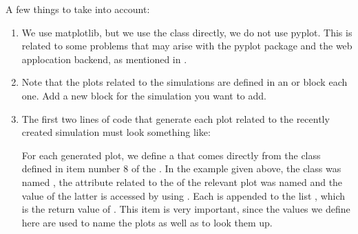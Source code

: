 \documentclass[a4paper,landscape,10pt,english]{sphinxmanual}
\begin{document}
A few things to take into account:
\begin{enumerate}
%
\item {} 
We use matplotlib, but we use the class  directly, we do not use
pyplot. This is related to some problems that may arise with the pyplot
package and the web applocation backend, as mentioned in
.

\item {} 
Note that the plots related to the simulations are defined in an  or
 block each one. Add a new block for the simulation you want to add.

\item {} 
The first two lines of code that generate each plot related to the recently
created simulation must look something like:

\begin{sphinxVerbatim}[commandchars=\\\{\}]
  
\end{sphinxVerbatim}

For each generated plot, we define a  that comes directly
from the class defined in item number 8 of the
{\hyperref[\detokenize{code_docs/new_simulation:new-simulation-schemas}]{}}. In the example given above,
the class was named , the attribute related to the
 of the relevant plot was named  and the value
of the latter is accessed by using .
Each  is appended to the list ,
which is the return value of {\hyperref[\detokenize{code_docs/simulation_api.controller:simulation_api.controller.tasks._plot_solution}]{}}.
This item is very important, since the values we define here are used to name
the plots as well as to look them up.


\end{enumerate}
\end{document}
